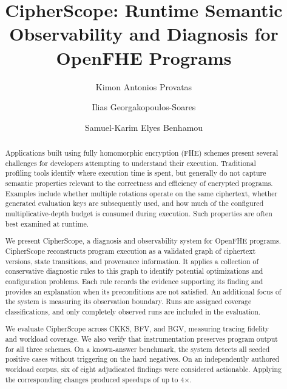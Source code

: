 \documentclass[sigconf,nonacm]{acmart}
\begin{document}
\title{CipherScope: Runtime Semantic Observability and Diagnosis for OpenFHE Programs}

\author{Kimon Antonios Provatas}

\author{Ilias Georgakopoulos-Soares}

\author{Samuel-Karim Elyes Benhamou}

\begin{abstract}
Applications built using fully homomorphic encryption (FHE) schemes present
several challenges for developers attempting to understand their execution.
Traditional profiling tools identify where execution time is spent, but
generally do not capture semantic properties relevant to the correctness and
efficiency of encrypted programs. Examples include whether multiple rotations
operate on the same ciphertext, whether generated evaluation keys are
subsequently used, and how much of the configured multiplicative-depth budget
is consumed during execution. Such properties are often best examined at
runtime.

We present CipherScope, a diagnosis and observability system for OpenFHE
programs. CipherScope reconstructs program execution as a validated graph of
ciphertext versions, state transitions, and provenance information. It
applies a collection of conservative diagnostic rules to this graph to
identify potential optimizations and configuration problems. Each rule
records the evidence supporting its finding and provides an explanation when
its preconditions are not satisfied. An additional focus of the system is
measuring its observation boundary. Runs are assigned coverage
classifications, and only completely observed runs are included in the
evaluation.

We evaluate CipherScope across CKKS, BFV, and BGV, measuring tracing fidelity
and workload coverage. We also verify that instrumentation preserves program
output for all three schemes. On a known-answer benchmark, the system detects
all seeded positive cases without triggering on the hard negatives. On an
independently authored workload corpus, six of eight adjudicated findings
were considered actionable. Applying the corresponding changes produced
speedups of up to 4$\times$.
\end{abstract}
\end{document}
